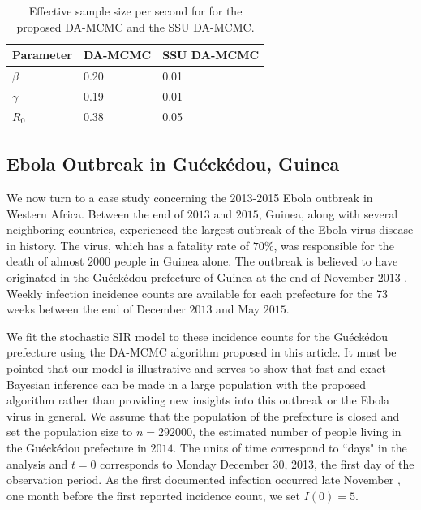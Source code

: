 \documentclass[11pt]{article}
\begin{document}
	 \begin{table}
        \centering
        \begin{tabular}{ C{2cm}| *{2}{C{3cm}}}
            Parameter & DA-MCMC & SSU DA-MCMC \\ 
            \hline
            $\beta$ & 0.20 & 0.01 \\ 
            $\gamma$ & 0.19 & 0.01 \\ 
            $R_0$ & 0.38 & 0.05 \\
            \hline
        \end{tabular}
        \caption{Effective sample size per second for for the proposed DA-MCMC and the SSU DA-MCMC.}
        \label{tab:E6}
    \end{table}
	
	\subsection{Ebola Outbreak in Gu\'eck\'edou, Guinea}
	\label{sec:ebo}
	
	We now turn to a case study concerning the 2013-2015 Ebola outbreak in Western Africa.
	Between the end of $2013$ and $2015$, Guinea, along with several neighboring countries, experienced the largest outbreak of the Ebola virus disease in history. The virus, which has a fatality rate of $70\%$, was responsible for the death of almost $2000$ people in Guinea alone.
	The outbreak is believed to have originated in the Gu\'eck\'edou prefecture of Guinea at the end of November $2013$ \cite{Baize.2014}. Weekly infection incidence counts are available for each prefecture for the $73$ weeks between the end of December $2013$ and May $2015$.
	
	We fit the stochastic SIR model to these incidence counts for the Gu\'eck\'edou prefecture using the DA-MCMC algorithm proposed in this article.
	It must be pointed that our model is illustrative and serves to show that fast and exact Bayesian inference can be made in a large population with the proposed algorithm rather than providing new insights into this outbreak or the Ebola virus in general. We assume that the population of the prefecture is closed and set the population size to $n = 292000$, the estimated number of people living in the Gu\'eck\'edou prefecture in $2014$.
	The units of time correspond to ``days" in the analysis and $t=0$ corresponds to Monday December 30, 2013, the first day of the observation period.
	As the first documented infection occurred late November \cite{Baize.2014}, one month before the first reported incidence count, we set $I(0) = 5$.
	
\end{document}
